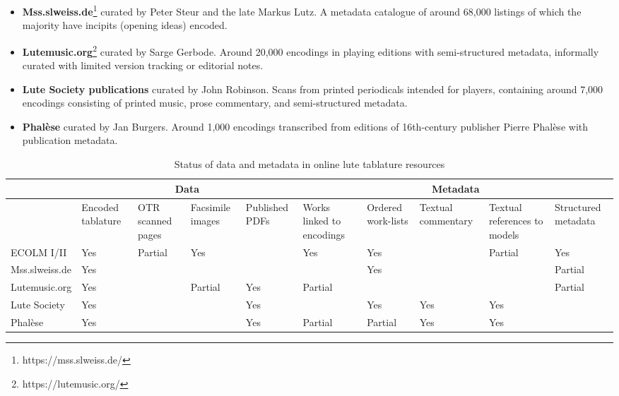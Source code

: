 \documentclass[sigconf]{acmart}
\begin{document}
\begin{sloppypar}
  \begin{itemize}
    \item {\bf Mss.slweiss.de}\footnote{https://mss.slweiss.de/}
      curated by Peter Steur and the late Markus Lutz. A metadata
      catalogue of around 68,000 listings of which the majority have
      incipits (opening ideas) encoded.
    \item {\bf Lutemusic.org}\footnote{https://lutemusic.org/} curated
      by Sarge Gerbode. Around 20,000 encodings in playing editions
      with semi-structured metadata, informally curated with limited
      version tracking or editorial notes.
    \item {\bf Lute Society publications} curated by John
      Robinson. Scans from printed periodicals intended for players,
      containing around 7,000 encodings consisting of printed music,
      prose commentary, and semi-structured metadata.
    \item {\bf Phal\`ese} curated by Jan Burgers. Around 1,000
      encodings transcribed from editions of 16th-century publisher
      Pierre Phal\`ese with publication metadata.

  \end{itemize}

  \renewcommand{\arraystretch}{1.2}
  \setlength{\tabcolsep}{4pt}
  
  \begin{table}[t]
  \caption{Status of data and metadata in online lute tablature resources}
  \small
      \begin{tabularx}{\textwidth}{|l|X|X|X|X|X|X|X|X|X|}
        \hline
        & \multicolumn{4}{|c|}{\bf Data} & \multicolumn{5}{|c|}{\bf Metadata} \\
        \hline
        & Encoded tablature & OTR scanned pages & Facsimile images & Published PDFs
        & Works linked to encodings & Ordered work-lists & Textual commentary & Textual references to models & Structured metadata \\
        \hline
            {ECOLM I/II} & Yes & Partial & Yes & & Yes & Yes & & Partial & Yes \\
        \hline
            {Mss.slweiss.de} & Yes & & & & & Yes & & & Partial \\
        \hline
            {Lutemusic.org} & Yes & & Partial & Yes & Partial & & & & Partial \\
        \hline
            {Lute Society} & Yes &  & & Yes & & Yes & Yes & Yes & \\
        \hline
            {Phal\`ese} & Yes & & & Yes & Partial & Partial & Yes & Yes & \\
            \hline
      \end{tabularx}
  \label{table:datasets}
  \end{table}
  

\end{sloppypar}
\end{document}
